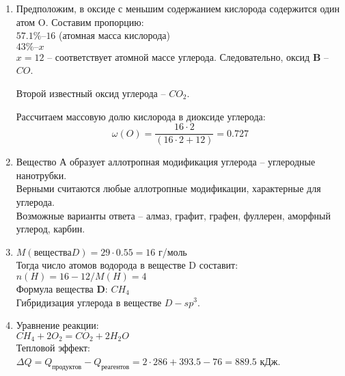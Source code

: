 \solutionSection
\begin{enumerate}
\item Предположим, в оксиде с меньшим содержанием кислорода содержится один атом O. Составим пропорцию:\\
$57.1\% – 16$ (атомная масса кислорода)\\
$43\% – x$\\
$x = 12$ – соответствует атомной массе углерода. Следовательно, оксид \textbf{B} – $CO$.

Второй известный оксид углерода – $CO_2$.

Рассчитаем массовую долю кислорода в диоксиде углерода:
$$\omega(O) = \frac{16\cdot2}{(16\cdot2+12)} = 0.727$$
\item Вещество А образует аллотропная модификация углерода – углеродные нанотрубки.\\
Верными считаются любые аллотропные модификации, характерные для углерода.\\
Возможные варианты ответа – алмаз, графит, графен, фуллерен, аморфный углерод, карбин.
\item $M(\text{вещества} D) = 29\cdot0.55 = 16$ г/моль\\
Тогда число атомов водорода в веществе D составит:\\
$n(H) = 16-12/M(H) = 4$\\
Формула вещества \textbf{D}: $CH_4$\\
Гибридизация углерода в веществе $D - sp^3$.
\item Уравнение реакции:\\
$CH_4 + 2O_2 = CO_2 + 2H_2O$\\
Тепловой эффект:\\
$\Delta Q = Q_\text{продуктов} - Q_\text{реагентов} = 2\cdot286 + 393.5 - 76 = 889.5$ кДж.
\end{enumerate}